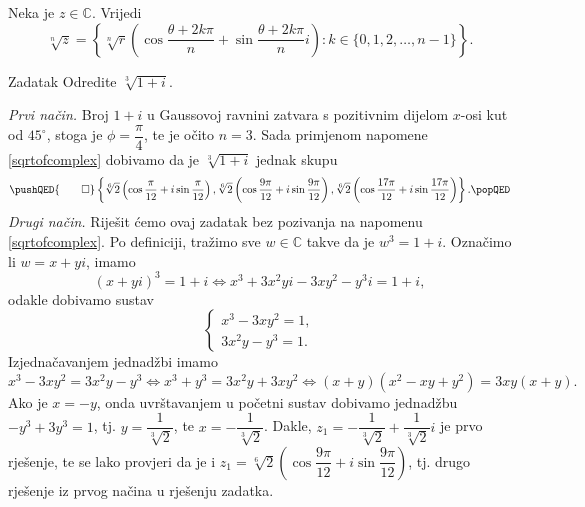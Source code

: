 \begin{remark}
\label{sqrtofcomplex}
Neka je $z\in \mathbb{C}$. Vrijedi 
\[\sqrt[n]{z}=\left\{\sqrt[n]{r}\left(\cos{\dfrac{\theta+2k\pi}{n}}+\sin{\dfrac{\theta+2k\pi}{n}}i\right) : k\in\{0, 1, 2, \dots, n-1\}\right\}.\]
\end{remark}

\begin{exercise}{Zadatak}
Odredite \(\sqrt[3]{1+i}\).
\end{exercise}
\begin{proof*}
\textit{Prvi način.} Broj $1+i$ u Gaussovoj ravnini zatvara s pozitivnim dijelom $x$-osi kut od $45^{\circ}$, stoga je $\phi=\dfrac{\pi}{4}$, te je očito $n=3$. Sada primjenom napomene \ref{sqrtofcomplex} dobivamo da je \(\sqrt[3]{1+i}\) jednak skupu
\[
\pushQED{\qed}
\left\{\sqrt[6]{2}\left(\cos{\dfrac{\pi}{12}}+i\sin{\dfrac{\pi}{12}}\right), \sqrt[6]{2}\left(\cos{\dfrac{9\pi}{12}}+i\sin{\dfrac{9\pi}{12}}\right), \sqrt[6]{2}\left(\cos{\dfrac{17\pi}{12}}+i\sin{\dfrac{17\pi}{12}}\right)\right\}.
\popQED
\]
\textit{Drugi način.} Riješit ćemo ovaj zadatak bez pozivanja na napomenu \ref{sqrtofcomplex}. Po definiciji, tražimo sve $w\in \mathbb{C}$ takve da je $w^3=1+i$. Označimo li $w=x+yi$, imamo
$$(x+yi)^3=1+i\Leftrightarrow x^3+3x^2yi-3xy^2-y^3i=1+i,$$
odakle dobivamo sustav
\[\begin{cases}
x^3-3xy^2=1,\\
3x^2y-y^3=1.
\end{cases}\]
Izjednačavanjem jednadžbi imamo
$$
x^3-3xy^2=3x^2y-y^3\Leftrightarrow x^3+y^3=3x^2y+3xy^2\Leftrightarrow (x+y)(x^2-xy+y^2)=3xy(x+y).
$$
Ako je $x=-y$, onda uvrštavanjem u početni sustav dobivamo jednadžbu $-y^3+3y^3=1$, tj. $y=\dfrac{1}{\sqrt[3]{2}}$, te $x=-\dfrac{1}{\sqrt[3]{2}}$. Dakle, $z_1=-\dfrac{1}{\sqrt[3]{2}}+\dfrac{1}{\sqrt[3]{2}}i$ je prvo rješenje, te se lako provjeri da je i $z_1=\sqrt[6]{2}\left(\cos{\dfrac{9\pi}{12}}+i\sin{\dfrac{9\pi}{12}}\right)$, tj. drugo rješenje iz prvog načina u rješenju zadatka.


\end{proof*}
